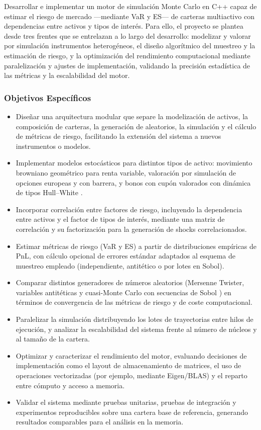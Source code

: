 \documentclass[11pt]{article}
\begin{document}
Desarrollar e implementar un motor de simulación Monte Carlo en C++ capaz de estimar el riesgo de mercado —mediante VaR y ES— de carteras multiactivo con dependencias entre activos y tipos de interés. Para ello, el proyecto se plantea desde tres frentes que se entrelazan a lo largo del desarrollo: modelizar y valorar por simulación instrumentos heterogéneos, el diseño algorítmico del muestreo y la estimación de riesgo, y la optimización del rendimiento computacional mediante paralelización y ajustes de implementación, validando la precisión estadística de las métricas y la escalabilidad del motor.

\subsubsection{Objetivos Específicos}

\begin{itemize}
    \item Diseñar una arquitectura modular que separe la modelización de activos, la composición de carteras, la generación de aleatorios, la simulación y el cálculo de métricas de riesgo, facilitando la extensión del sistema a nuevos instrumentos o modelos.
    \item Implementar modelos estocásticos para distintos tipos de activo: movimiento browniano geométrico para renta variable, valoración por simulación de opciones europeas y con barrera, y bonos con cupón valorados con dinámica de tipos Hull–White \cite{options2018hull}.
    \item Incorporar correlación entre factores de riesgo, incluyendo la dependencia entre activos y el factor de tipos de interés, mediante una matriz de correlación y su factorización para la generación de shocks correlacionados.
    \item Estimar métricas de riesgo (VaR y ES) a partir de distribuciones empíricas de PnL, con cálculo opcional de errores estándar adaptados al esquema de muestreo empleado (independiente, antitético o por lotes en Sobol).
    \item Comparar distintos generadores de números aleatorios (Mersenne Twister, variables antitéticas y cuasi-Monte Carlo con secuencias de Sobol \cite{matsumoto1998mersenne, hammersley1956new, sobol1967on}) en términos de convergencia de las métricas de riesgo y de coste computacional.
    \item Paralelizar la simulación distribuyendo los lotes de trayectorias entre hilos de ejecución, y analizar la escalabilidad del sistema frente al número de núcleos y al tamaño de la cartera.
    \item Optimizar y caracterizar el rendimiento del motor, evaluando decisiones de implementación como el layout de almacenamiento de matrices, el uso de operaciones vectorizadas (por ejemplo, mediante Eigen/BLAS) y el reparto entre cómputo y acceso a memoria.
    \item Validar el sistema mediante pruebas unitarias, pruebas de integración y experimentos reproducibles sobre una cartera base de referencia, generando resultados comparables para el análisis en la memoria.
\end{itemize}
\end{document}

